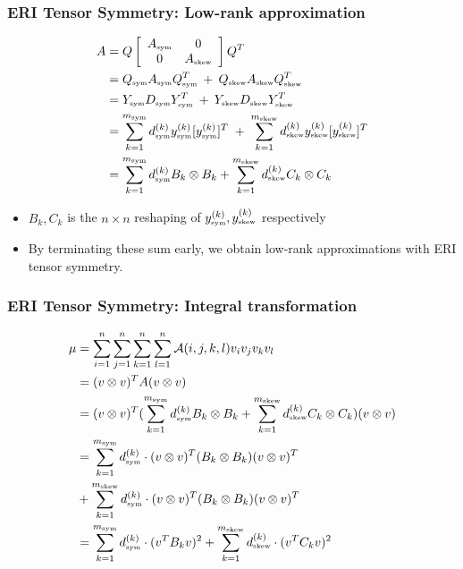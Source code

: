 \documentclass[bigger]{beamer}
\newcommand{\kron}     { \otimes }
\begin{document}
\begin{frame}
\frametitle{ERI Tensor Symmetry: Low-rank approximation}
\label{sec-1-24}

\begin{align*}
A&= Q \left[ \begin{array}{cc} A_{\mbox{\tiny sym}} & 0 \\ 0 & A_{\mbox{\tiny skew}} \end{array} \right] Q^{T}\\
&=  Q_{\mbox{\tiny sym}}A_{\mbox{\tiny sym}} Q_{\mbox{\tiny sym}}^{T} \:+\: Q_{\mbox{\tiny skew}}A_{\mbox{\tiny skew}} Q_{\mbox{\tiny skew}}^{T}\\
&= Y_{\mbox{\tiny sym}}D_{\mbox{\tiny sym}} Y_{\mbox{\tiny sym}}^{T} \:+\: Y_{\mbox{\tiny skew}}D_{\mbox{\tiny skew}} Y_{\mbox{\tiny skew}}^{T}\\
&= \sum_{k=1}^{m_{\mbox{\tiny sym}}} d_{\mbox{\tiny sym}}^{(k)} y_{\mbox{\tiny sym}}^{(k)}[y_{\mbox{\tiny sym}}^{(k)}]^{T} \;+\;
    \sum_{k=1}^{m_{\mbox{\tiny skew}}} d_{\mbox{\tiny skew}}^{(k)} y_{\mbox{\tiny skew}}^{(k)}[y_{\mbox{\tiny skew}}^{(k)}]^{T}\\
&= \sum_{k=1}^{m_{\mbox{\tiny sym}}} d_{\mbox{\tiny sym}}^{(k)} B_k \kron B_k+\sum_{k=1}^{m_{\mbox{\tiny skew}}} d_{\mbox{\tiny skew}}^{(k)} C_k \kron C_k
\end{align*}
\begin{itemize}

\item $B_k,C_k$ is the $n\times n$ reshaping of $y_{\mbox{\tiny sym}}^{(k)},y_{\mbox{\tiny skew}}^{(k)}$ respectively
\label{sec-1-24-1}%

\item By terminating these sum early, we obtain low-rank approximations with ERI tensor symmetry.
\label{sec-1-24-2}%

\end{itemize} %
\end{frame}
\begin{frame}
\frametitle{ERI Tensor Symmetry: Integral transformation}
\label{sec-1-25}

\begin{align*}
\mu 
&= \sum_{i=1}^n \sum_{j=1}^n \sum_{k=1}^n \sum_{l=1}^n \mathcal{A}(i,j,k,l)v_iv_jv_kv_l\\
&= (v \otimes v)^T A (v \otimes v)\\
&= (v\kron v)^{T}(\sum_{k=1}^{m_{\mbox{\tiny sym}}} d_{\mbox{\tiny sym}}^{(k)} B_k \kron B_k+\sum_{k=1}^{m_{\mbox{\tiny skew}}} d_{\mbox{\tiny skew}}^{(k)} C_k \kron C_k)(v \kron v)\\
&= \sum_{k=1}^{m_{\mbox{\tiny sym}}} d_{\mbox{\tiny sym}}^{(k)} \cdot (v \otimes v)^T(B_k\otimes B_k)(v \otimes v)^T \\ 
&+ \sum_{k=1}^{m_{\mbox{\tiny skew}}} d_{\mbox{\tiny sym}}^{(k)} \cdot (v \otimes v)^T(B_k\otimes B_k)(v \otimes v)^T\\
&= \sum_{k=1}^{m_{\mbox{\tiny sym}}} d_{\mbox{\tiny sym}}^{(k)} \cdot (v^TB_kv)^2+ \sum_{k=1}^{m_{\mbox{\tiny skew}}} d_{\mbox{\tiny skew}}^{(k)} \cdot (v^TC_kv)^2
\end{align*}
\end{frame}
\end{document}
